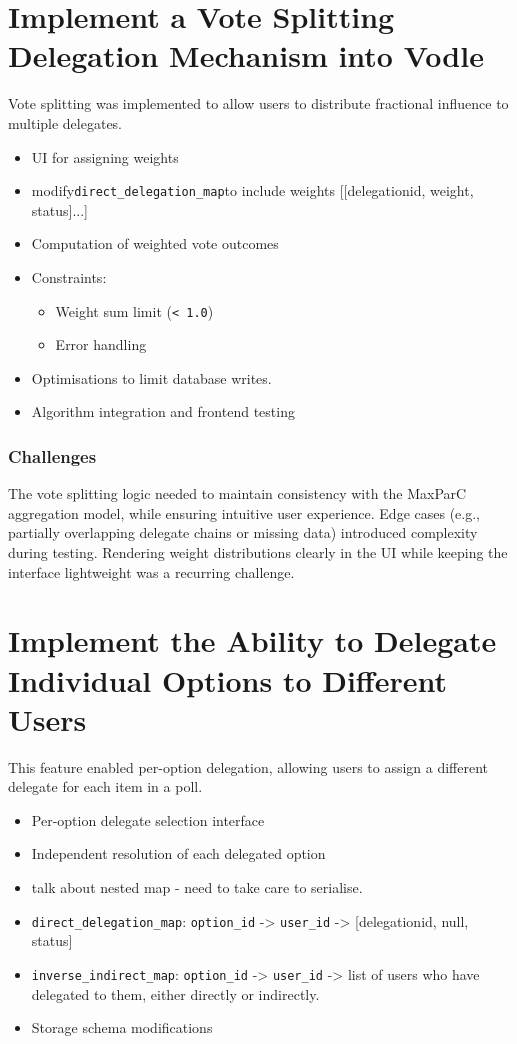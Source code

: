 \section{Implement a Vote Splitting Delegation Mechanism into Vodle}
Vote splitting was implemented to allow users to distribute fractional influence to multiple delegates.

\begin{itemize}
  \item UI for assigning weights
  \item modify\verb|direct_delegation_map|to include weights [[delegationid, weight, status]...]
  \item Computation of weighted vote outcomes
  \item Constraints:
  \begin{itemize}
    \item Weight sum limit (\texttt{< 1.0})
    \item Error handling
  \end{itemize}
  \item Optimisations to limit database writes.
  \item Algorithm integration and frontend testing
\end{itemize}

\subsubsection{Challenges}
The vote splitting logic needed to maintain consistency with the MaxParC aggregation model, while ensuring intuitive user experience. Edge cases (e.g., partially overlapping delegate chains or missing data) introduced complexity during testing. Rendering weight distributions clearly in the UI while keeping the interface lightweight was a recurring challenge.

\section{Implement the Ability to Delegate Individual Options to Different Users}
This feature enabled per-option delegation, allowing users to assign a different delegate for each item in a poll.

\begin{itemize}
  \item Per-option delegate selection interface
  \item Independent resolution of each delegated option
  \item talk about nested map - need to take care to serialise.
  \item \verb|direct_delegation_map|: \verb|option_id| -> \verb|user_id| -> [delegationid, null, status]
  \item \verb|inverse_indirect_map|: \verb|option_id| -> \verb|user_id| -> list of users who have delegated to them, either directly or indirectly.
  \item Storage schema modifications
\end{itemize}

